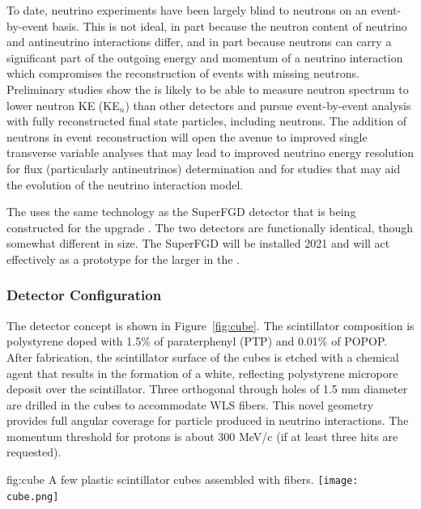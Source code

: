 To date, neutrino experiments have been largely blind to neutrons on an event-by-event basis.  This is not ideal, in part because the neutron content of neutrino and antineutrino interactions differ, and in part because neutrons can carry a significant part of the outgoing energy and momentum of a neutrino interaction which compromises the reconstruction of events with missing neutrons.  Preliminary studies show the  is likely to be able to measure neutron spectrum to lower neutron KE (KE$_{n}$) than other detectors and pursue event-by-event analysis with fully reconstructed final state particles, including neutrons. The addition of neutrons in event reconstruction will open the avenue to improved single transverse variable analyses that may lead to improved neutrino energy resolution for flux (particularly antineutrinos) determination and for studies that may aid the evolution of the neutrino interaction model.

The  uses the same technology as the SuperFGD detector that is being constructed for the   upgrade \cite{Abe:2019whr}.  The two detectors are functionally identical, though somewhat different in size.  The SuperFGD will be installed 2021 and will act effectively as a prototype for the larger  in the   . 


\subsubsection{Detector Configuration}

The  detector concept is shown in Figure~\ref{fig:cube}.
The scintillator composition is polystyrene doped with 1.5\% of paraterphenyl (PTP) and 0.01\% of POPOP. After fabrication, the scintillator surface of the cubes is etched with a chemical agent that results in the formation of a white, reflecting polystyrene micropore deposit over the scintillator. Three orthogonal through holes of 1.5 mm diameter are drilled in the cubes to accommodate WLS fibers. 
This novel geometry provides full angular coverage for particle produced in neutrino interactions.  The momentum threshold for protons is about 300 MeV/c (if at least three hits are requested).



\begin{dunefigure}{fig:cube}
{A few plastic scintillator cubes assembled with  fibers.}
  \texttt{[image: cube.png]}
\end{dunefigure}

